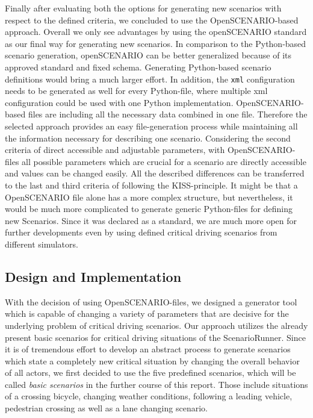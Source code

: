 \documentclass[conference, 11pt]{IEEEtran}
\begin{document}
Finally after evaluating both the options for generating new scenarios with respect to the defined criteria, we concluded to use the OpenSCENARIO-based approach. Overall we only see advantages by using the openSCENARIO standard as our final way for generating new scenarios. In comparison to the Python-based scenario generation, openSCENARIO can be better generalized because of its approved standard and fixed schema. Generating Python-based scenario definitions would bring a much larger effort. In addition, the \texttt{xml} configuration needs to be generated as well for every Python-file, where multiple xml configuration could be used with one Python implementation. OpenSCENARIO-based files are including all the necessary data combined in one file. Therefore the selected approach provides an easy file-generation process while maintaining all the information necessary for describing one scenario. Considering the second criteria of direct accessible and adjustable parameters, with OpenSCENARIO-files all possible parameters which are crucial for a scenario are directly accessible and values can be changed easily.
All the described differences can be transferred to the last and third criteria of following the KISS-principle. It might be that a OpenSCENARIO file alone has a more complex structure, but nevertheless, it would be much more complicated to generate generic Python-files for defining new Scenarios. Since it was declared as a standard, we are much more open for further developments even by using defined critical driving scenarios from different simulators.

\subsection{Design and Implementation}
With the decision of using OpenSCENARIO-files, we designed a generator tool which is capable of changing a variety of parameters that are decisive for the underlying problem of critical driving scenarios. Our approach utilizes the already present basic scenarios for critical driving situations of the ScenarioRunner. Since it is of tremendous effort to develop an abstract process to generate scenarios which state a completely new critical situation by changing the overall behavior of all actors, we first decided to use the five predefined scenarios, which will be called \textit{basic scenarios} in the further course of this report. Those include situations of a crossing bicycle,  changing weather conditions, following a leading vehicle, pedestrian crossing as well as a lane changing scenario.
\end{document}
